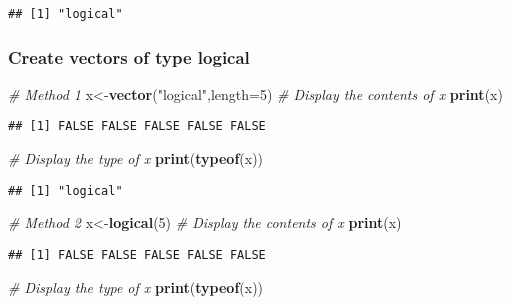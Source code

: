 \documentclass[
]{article}
\newenvironment{Shaded}{\begin{snugshade}}{\end{snugshade}}
\newcommand{\AttributeTok}[1]{\textcolor[rgb]{0.13,0.29,0.53}{#1}}
\newcommand{\CommentTok}[1]{\textcolor[rgb]{0.56,0.35,0.01}{\textit{#1}}}
\newcommand{\DecValTok}[1]{\textcolor[rgb]{0.00,0.00,0.81}{#1}}
\newcommand{\FunctionTok}[1]{\textcolor[rgb]{0.13,0.29,0.53}{\textbf{#1}}}
\newcommand{\NormalTok}[1]{#1}
\newcommand{\OtherTok}[1]{\textcolor[rgb]{0.56,0.35,0.01}{#1}}
\newcommand{\StringTok}[1]{\textcolor[rgb]{0.31,0.60,0.02}{#1}}
\begin{document}
\begin{verbatim}
## [1] "logical"
\end{verbatim}

\hypertarget{create-vectors-of-type-logical}{%
\subsubsection{Create vectors of type
logical}\label{create-vectors-of-type-logical}}

\begin{Shaded}
\begin{Highlighting}[]
\CommentTok{\# Method 1}
\NormalTok{x}\OtherTok{\textless{}{-}}\FunctionTok{vector}\NormalTok{(}\StringTok{"logical"}\NormalTok{,}\AttributeTok{length=}\DecValTok{5}\NormalTok{)}
\CommentTok{\# Display the contents of x}
\FunctionTok{print}\NormalTok{(x)}
\end{Highlighting}
\end{Shaded}

\begin{verbatim}
## [1] FALSE FALSE FALSE FALSE FALSE
\end{verbatim}

\begin{Shaded}
\begin{Highlighting}[]
\CommentTok{\# Display the type of x}
\FunctionTok{print}\NormalTok{(}\FunctionTok{typeof}\NormalTok{(x))}
\end{Highlighting}
\end{Shaded}

\begin{verbatim}
## [1] "logical"
\end{verbatim}

\begin{Shaded}
\begin{Highlighting}[]
\CommentTok{\# Method 2}
\NormalTok{x}\OtherTok{\textless{}{-}}\FunctionTok{logical}\NormalTok{(}\DecValTok{5}\NormalTok{)}
\CommentTok{\# Display the contents of x}
\FunctionTok{print}\NormalTok{(x)}
\end{Highlighting}
\end{Shaded}

\begin{verbatim}
## [1] FALSE FALSE FALSE FALSE FALSE
\end{verbatim}

\begin{Shaded}
\begin{Highlighting}[]
\CommentTok{\# Display the type of x}
\FunctionTok{print}\NormalTok{(}\FunctionTok{typeof}\NormalTok{(x))}
\end{Highlighting}
\end{Shaded}
\end{document}
